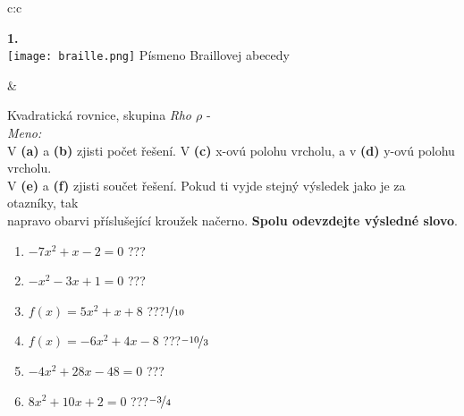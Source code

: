 \documentclass[10pt]{report}
\begin{document}
\begin{tabular}{c:c}
\begin{minipage}[c][99mm][t]{0.49\linewidth}
\begin{center}
\begin{minipage}{0.20\linewidth}
\begin{center}
{\Huge\bfseries 1.} \\[2mm]
\texttt{[image: braille.png]}
{\small Písmeno Braillovej abecedy}
\end{center}
\end{minipage}
\end{center}
\end{minipage}
&
\begin{minipage}[c][99mm][t]{0.49\linewidth}
\begin{center}
\vspace{7mm}
{\huge Kvadratická rovnice, skupina \textit{Rho $\rho$} -}\\[4.5mm]
\textit{Meno:}\phantom{xxxxxxxxxxxxxxxxxxxxxxxxxxxxxxxxxxxxxxxxxxxxxxxxxxxxxxxxxxxxxxxxx}\\[3.5mm]
V \textbf{(a)} a \textbf{(b)} zjisti počet řešení. V \textbf{(c)} x-ovú polohu vrcholu, a v \textbf{(d)} y-ovú polohu vrcholu.\\V \textbf{(e)} a \textbf{(f)} zjisti součet řešení. Pokud ti vyjde stejný výsledek jako je za otazníky, tak\\napravo obarvi příslušející kroužek načerno. \textbf{Spolu odevzdejte výsledné slovo}.\\[3mm]
\begin{minipage}{0.77\linewidth}
\begin{center}
\begin{varwidth}{\textwidth}
\begin{enumerate}
\large
\item $-7x^2+x-2=0$\quad \dotfill\; ???\;\dotfill {}
\item $-x^2-3x+1=0$\quad \dotfill\; ???\;\dotfill {}
\item $f(x)=5x^2+x+8$\quad \dotfill\; ???\;\dotfill \quad $\nicefrac{1}{10}$
\item $f(x)=-6x^2+4x-8$\quad \dotfill\; ???\;\dotfill \quad $\nicefrac{-10}{3}$
\item $-4x^2+28x-48=0$\quad \dotfill\; ???\;\dotfill {}
\item $8x^2+10x+2=0$\quad \dotfill\; ???\;\dotfill \quad $\nicefrac{-3}{4}$
\end{enumerate}
\end{varwidth}
\end{center}
\end{minipage}
\begin{minipage}{0.20\linewidth}

\end{minipage}
\end{center}
\end{minipage}
\end{tabular}
\end{document}
